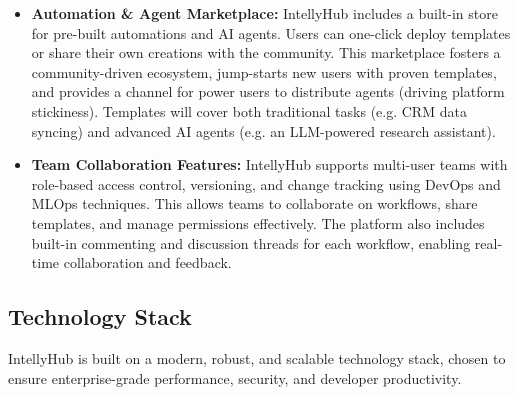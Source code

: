 \documentclass[11pt, a4paper, oneside]{article}
\begin{document}
\begin{itemize}
    \item \textbf{Automation \& Agent Marketplace:} IntellyHub includes a built-in store for pre-built automations and AI agents. Users can one-click deploy templates or share their own creations with the community. This marketplace fosters a community-driven ecosystem, jump-starts new users with proven templates, and provides a channel for power users to distribute agents (driving platform stickiness). Templates will cover both traditional tasks (e.g. CRM data syncing) and advanced AI agents (e.g. an LLM-powered research assistant).
    
    \item \textbf{Team Collaboration Features:} IntellyHub supports multi-user teams with role-based access control, versioning, and change tracking using DevOps and MLOps techniques. This allows teams to collaborate on workflows, share templates, and manage permissions effectively. The platform also includes built-in commenting and discussion threads for each workflow, enabling real-time collaboration and feedback.
\end{itemize}

\pagebreak
\subsection{Technology Stack}
IntellyHub is built on a modern, robust, and scalable technology stack, chosen to ensure enterprise-grade performance, security, and developer productivity.
\end{document}
